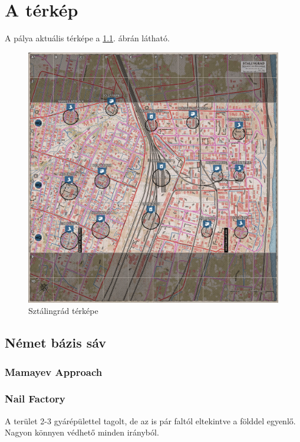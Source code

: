 \chapter{A térkép}
A pálya aktuális térképe a \ref{fig:stalingrad}. ábrán látható.

\begin{figure}
    \centering
    \includegraphics[width=150mm, keepaspectratio]{figures/StalingradMap.png}
    \caption{Sztálingrád térképe}
    \label{fig:stalingrad}
\end{figure}

\section{Német bázis sáv}
\subsection{Mamayev Approach}

\subsection{Nail Factory}
A terület 2-3 gyárépülettel tagolt, de az is pár faltól eltekintve a földdel egyenlő. Nagyon könnyen védhető minden irányból.

